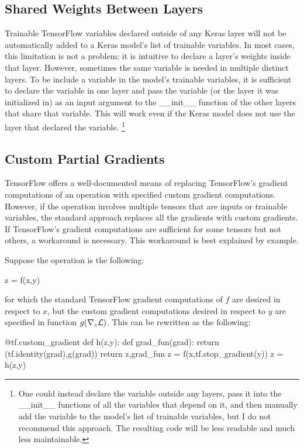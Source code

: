 \subsection{Shared Weights Between Layers}
Trainable TensorFlow variables declared outside of any Keras layer will not be automatically added to a Keras model's list of trainable variables. In most cases, this limitation is not a problem; it is intuitive to declare a layer's weights inside that layer. However, sometimes the same variable is needed in multiple distinct layers. To be include a variable in the model's trainable variables, it is sufficient to declare the variable in one layer and pass the variable (or the layer it was initialized in) as an input argument to the \_\_init\_\_ function of the other layers that share that variable. This will work even if the Keras model does not use the layer that declared the variable. \footnote{One could instead declare the variable outside any layers, pass it into the \_\_init\_\_ functions of all the variables that depend on it, and then manually add the variable to the model's list of trainable variables, but I do not recommend this approach. The resulting code will be less readable and much less maintainable.}

\subsection{Custom Partial Gradients}
TensorFlow offers a well-documented means of replacing TensorFlow's gradient computations of an operation with specified custom gradient computations. However, if the operation involves multiple tensors that are inputs or trainable variables, the standard approach replaces all the gradients with custom gradients. If TensorFlow's gradient computations are sufficient for some tensors but not others, a workaround is necessary. This workaround is best explained by example.

Suppose the operation is the following:


\begin{code}
z = f(x,y)
\end{code}

for which the standard TensorFlow gradient computations of $f$ are desired in respect to $x$, but the custom gradient computations desired in respect to $y$ are specified in function $g(\nabla_z \mathcal{L})$. This can be rewritten as the following:

\begin{code}
@tf.custom_gradient
def h(z,y):
    def grad_fun(grad):
        return (tf.identity(grad),g(grad))
    return z,grad_fun
z = f(x,tf.stop_gradient(y))
z = h(z,y)
\end{code}

